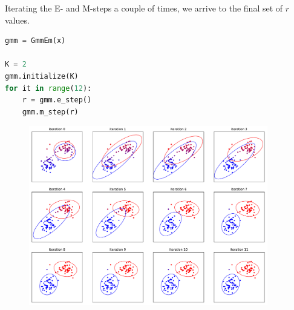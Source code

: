 \no Iterating the E- and M-steps a couple of times, we arrive to the final set of $r$ values.
\begin{lstlisting}[language=python]
gmm = GmmEm(x)

K = 2
gmm.initialize(K)
for it in range(12):
    r = gmm.e_step()
    gmm.m_step(r)
\end{lstlisting}

\begin{figure}[h!]
\centering
	\includegraphics[width=0.93\textwidth]{./figs/05-gmm-iterations.pdf}
\end{figure}





